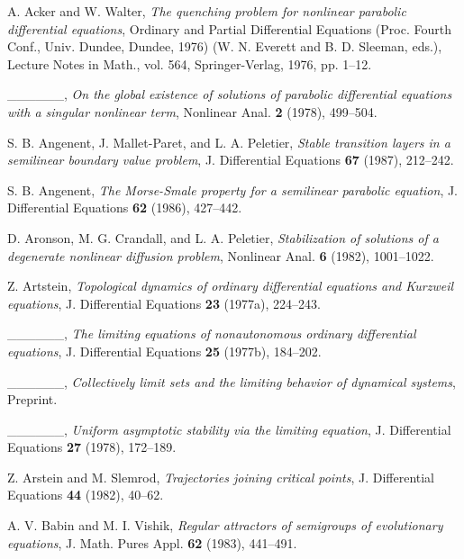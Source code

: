 \documentclass{surv-l}
\theoremstyle{plain}
\theoremstyle{definition}
\numberwithin{equation}{section}
\numberwithin{figure}{chapter}
\begin{document}
\begin{thebibliography}{}

 A. Acker and W. Walter, \emph{The quenching problem for nonlinear parabolic differential equations}, Ordinary and Partial Differential Equations (Proc. Fourth Conf., Univ. Dundee, Dundee, 1976) (W. N. Everett and B. D. Sleeman, eds.), Lecture Notes in Math., vol. 564, Springer-Verlag, 1976, pp. 1--12.

 \_\_\_\_\_\_, \emph{On the global existence of solutions of parabolic differential equations with a singular nonlinear term}, Nonlinear Anal. \textbf{2} (1978), 499--504.

 S. B. Angenent, J. Mallet-Paret, and L. A. Peletier, \emph{Stable transition layers in a semilinear boundary value problem}, J. Differential Equations \textbf{67} (1987), 212--242.

 S. B. Angenent, \emph{The Morse-Smale property for a semilinear parabolic equation}, J. Differential Equations \textbf{62} (1986), 427--442.

 D. Aronson, M. G. Crandall, and L. A. Peletier, \emph{Stabilization of solutions of a degenerate nonlinear diffusion problem}, Nonlinear Anal. \textbf{6} (1982), 1001--1022.

 Z. Artstein, \emph{Topological dynamics of ordinary differential equations and Kurzweil equations}, J. Differential Equations \textbf{23} (1977a), 224--243.

 \_\_\_\_\_\_, \emph{The limiting equations of nonautonomous ordinary differential equations}, J. Differential Equations \textbf{25} (1977b), 184--202.

 \_\_\_\_\_\_, \emph{Collectively limit sets and the limiting behavior of dynamical systems}, Preprint.

 \_\_\_\_\_\_, \emph{Uniform asymptotic stability via the limiting equation}, J. Differential Equations \textbf{27} (1978), 172--189.

 Z. Arstein and M. Slemrod, \emph{Trajectories joining critical points}, J. Differential Equations \textbf{44} (1982), 40--62.

 A. V. Babin and M. I. Vishik, \emph{Regular attractors of semigroups of evolutionary equations}, J. Math. Pures Appl. \textbf{62} (1983), 441--491.


\end{thebibliography}
\end{document}
